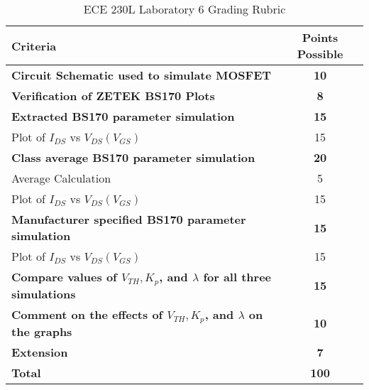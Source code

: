 \documentclass[12pt]{../manual}
\begin{document}
%
\newpage
\def\arraystretch{1.2}
{}
\hspace{0pt}
\vfill %
\begin{table}[ht!]
\caption{ECE 230L Laboratory 6 Grading Rubric}
\centering
\begin{tabular}{l|c} \hline
Criteria & Points Possible \\ \hline \hline
\textbf{Circuit Schematic used to simulate MOSFET}	& \textbf{10} \\ \hline
\textbf{Verification of ZETEK BS170 Plots}			& \textbf{8} \\ \hline
\textbf{Extracted BS170 parameter simulation}		& \textbf{15} \\
Plot of $I_{DS}$ vs $V_{DS}(V_{GS})$ 				& 15 \\ \hline
\textbf{Class average BS170 parameter simulation}	& \textbf{20} \\
Average Calculation									& 5 \\ 
Plot of $I_{DS}$ vs $V_{DS}(V_{GS})$ 				& 15 \\ \hline
\textbf{Manufacturer specified BS170 parameter simulation}		& \textbf{15} \\
Plot of $I_{DS}$ vs $V_{DS}(V_{GS})$ 				& 15 \\ \hline
\textbf{Compare values of $V_{TH}, K_p$, and $\lambda$ for all three simulations} & \textbf{15} \\ \hline
\textbf{Comment on the effects of $V_{TH}, K_p$, and $\lambda$ on the graphs} & \textbf{10} \\ \hline
{\bf Extension} 									& {\bf 7} \\ \hline \hline
{\bf Total}											& {\bf 100} \\ \hline
\end{tabular}
\end{table}
\vfill %
\end{document}
